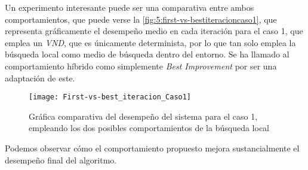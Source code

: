 Un experimento interesante puede ser una comparativa entre ambos comportamientos, que puede verse la \autoref{fig:5:first-vs-bestiteracioncaso1}, que representa gráficamente el desempeño medio en cada iteración para el caso 1, que emplea un \textit{VND}, que es únicamente determinista, por lo que tan solo emplea la búsqueda local como medio de búsqueda dentro del entorno. Se ha llamado al comportamiento híbrido como simplemente \textit{Best Improvement} por ser una adaptación de este.

\begin{figure}
	\centering
	\texttt{[image: First-vs-best\_iteracion\_Caso1]}
	\caption{Gráfica comparativa del desempeño del sistema para el caso 1, empleando los dos posibles comportamientos de la búsqueda local}
	\label{fig:5:first-vs-bestiteracioncaso1}
\end{figure}

Podemos observar cómo el comportamiento propuesto mejora sustancialmente el desempeño final del algoritmo.